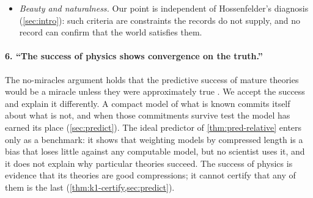 \begin{itemize}
        prefers the simplest answer to a fixed question, converges to the truth with
        worst-case optimal retractions \citep{kelly2007}, or optimal reversals and
        cycles of opinion \citep{genin-kelly2019}. This
        justification is not machine-relative, and we accept it. It is relative to a
        chosen question and its partition into answers, and it guarantees efficient
        convergence in the limit, never certification: an Ockham method never knows
        that it has stopped retracting. It is consistent with our claim.
  \item \emph{Beauty and naturalness.} Our point is independent of Hossenfelder's
        diagnosis (\cref{sec:intro}):
        such criteria are constraints the records do not supply, and no
        record can confirm that the world satisfies them.
\end{itemize}

\paragraph{6. ``The success of physics shows convergence on the truth.''}
The no-miracles argument holds that the predictive success of mature theories would
be a miracle unless they were approximately true \citep{putnam1975}. We accept the
success and explain it differently. A compact model of what is known commits itself
about what is not, and when those commitments survive test the model has earned its
place (\cref{sec:predict}). The ideal predictor of \cref{thm:pred-relative} enters only as a
benchmark: it shows that weighting models by compressed length is a
bias that loses little against any computable model, but no scientist uses it, and
it does not explain why particular theories succeed. The
success of physics is evidence that its theories are good compressions; it cannot
certify that any of them is the last (\cref{thm:k1-certify,sec:predict}).

